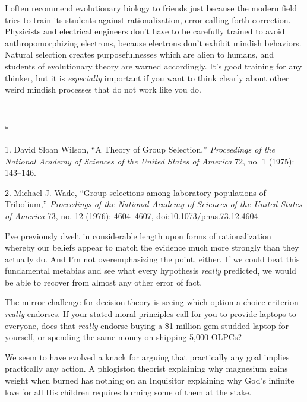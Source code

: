 {
 I often recommend evolutionary biology to friends just because the
modern field tries to train its students against rationalization, error
calling forth correction. Physicists and electrical engineers
don't have to be carefully trained to avoid
anthropomorphizing electrons, because electrons don't
exhibit mindish behaviors. Natural selection creates purposefulnesses
which are alien to humans, and students of evolutionary theory are
warned accordingly. It's good training for any thinker,
but it is \textit{especially} important if you want to think clearly
about other weird mindish processes that do not work like you do.}

{\centering
 \ ~
\par}

{\centering
 *
\par}


\bigskip

{
 1. David Sloan Wilson, ``A Theory of Group
Selection,'' \textit{Proceedings of the National
Academy of Sciences of the United States of America} 72, no. 1 (1975):
143--146.}

{
 2. Michael J. Wade, ``Group selections among
laboratory populations of Tribolium,''
\textit{Proceedings of the National Academy of Sciences of the United
States of America} 73, no. 12 (1976): 4604--4607,
doi:10.1073/pnas.73.12.4604.}


{
 I've previously dwelt in considerable length upon
forms of rationalization whereby our beliefs appear to match the
evidence much more strongly than they actually do. And
I'm not overemphasizing the point, either. If we could
beat this fundamental metabias and see what every hypothesis
\textit{really} predicted, we would be able to recover from almost any
other error of fact. }

{
 The mirror challenge for decision theory is seeing which option a
choice criterion \textit{really} endorses. If your stated moral
principles call for you to provide laptops to everyone, does that
\textit{really} endorse buying a \$1 million gem-studded laptop for
yourself, or spending the same money on shipping 5,000 OLPCs?}

{
 We seem to have evolved a knack for arguing that practically any
goal implies practically any action. A phlogiston theorist explaining
why magnesium gains weight when burned has nothing on an Inquisitor
explaining why God's infinite love for all His children
requires burning some of them at the stake.}

